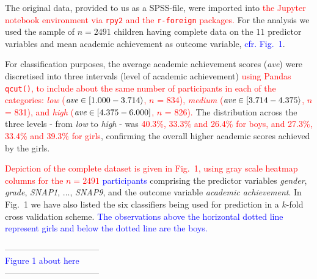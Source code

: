 \documentclass[10pt,letterpaper]{article}
\begin{document}
The original data, provided to us as a SPSS-file, were imported into \textcolor{red}{the Jupyter notebook environment via {\tt rpy2} and the {\tt r-foreign} packages.} 
For the analysis we used the sample of  $n=2491$ children having complete data 
on the $11$ predictor variables and mean academic achievement as outcome variable, \textcolor{blue}{cfr. Fig.~1}.

 For classification purposes, the average academic achievement scores (\emph{ave}) were discretised into three intervals (level of academic achievement) 
 \textcolor{red}{using Pandas {\tt qcut()}, to include about the same number of participants in each of the categories:  
{\it low} (${\text{\it ave}} \in [1.000 - 3.714\rangle$,  $n$ = 834),
{\it medium} (${\text{\it ave}} \in [3.714 - 4.375\rangle$, $n$ = 831), and
{\it high} (${\text{\it ave}} \in [4.375 - 6.000]$, $n$ = 826). }
The distribution across the three levels - from {\it low} to {\it high} - was 
\textcolor{red}{40.3\%, 33.3\% and 26.4\% for boys, and 27.3\%, 33.4\% and 39.3\% for girls}, 
confirming the overall higher academic scores achieved by the girls. 

\textcolor{red}{Depiction of the complete dataset is given in Fig.~1,  using gray scale heatmap columns for the $n=2491$}  \textcolor{blue}{participants}  comprising 
the predictor variables {\it gender}, {\it grade}, 
{\it SNAP1}, ..., {\it SNAP9}, and the outcome variable {\it academic achievement}. In Fig.~1 we have also listed the
 six classifiers being used for prediction in a $k$-fold cross validation scheme. \textcolor{blue}{The observations above the horizontal dotted line represent girls and below the dotted line are the boys.}
 
 \vspace{3mm}
 
 \begin{center}
 ---------------------------------\\
 
 \textcolor{blue}{Figure 1 about here} \\
 
  ---------------------------------\\
  \end{center}
  
  \vspace{3mm}
  
 
\end{document}
